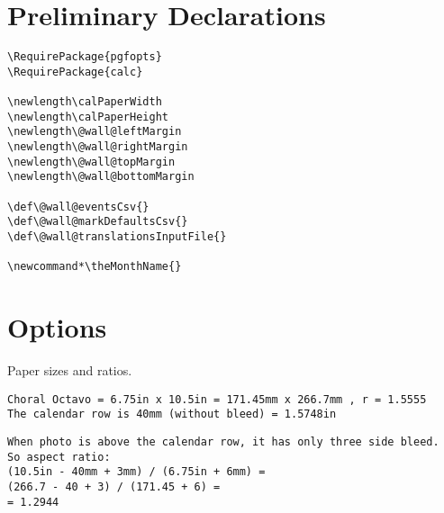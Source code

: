 \documentclass[11pt,oneside]{memoir-article}
\begin{document}
\chapter{Preliminary Declarations}
\label{sec-4}

\begin{verbatim}
\RequirePackage{pgfopts}
\RequirePackage{calc}

\newlength\calPaperWidth
\newlength\calPaperHeight
\newlength\@wall@leftMargin
\newlength\@wall@rightMargin
\newlength\@wall@topMargin
\newlength\@wall@bottomMargin

\def\@wall@eventsCsv{}
\def\@wall@markDefaultsCsv{}
\def\@wall@translationsInputFile{}

\newcommand*\theMonthName{}
\end{verbatim}

\chapter{Options}
\label{sec-5}

Paper sizes and ratios.

\begin{verbatim}
Choral Octavo = 6.75in x 10.5in = 171.45mm x 266.7mm , r = 1.5555
The calendar row is 40mm (without bleed) = 1.5748in
\end{verbatim}

\begin{verbatim}
When photo is above the calendar row, it has only three side bleed.
So aspect ratio:
(10.5in - 40mm + 3mm) / (6.75in + 6mm) = 
(266.7 - 40 + 3) / (171.45 + 6) =
= 1.2944
\end{verbatim}
\end{document}
